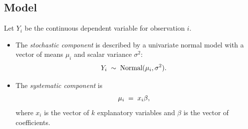 \documentclass[letterpaper,10pt,english]{sphinxmanual}
\begin{document}
\subsection{Model}
\label{vignette:id36}
Let \(Y_i\) be the continuous dependent variable for observation
\(i\).
\begin{itemize}
\item {} 
The \emph{stochastic component} is described by a univariate normal model
with a vector of means \(\mu_i\) and scalar variance
\(\sigma^2\):
\begin{gather}
\begin{split}Y_i \; \sim \; \textrm{Normal}(\mu_i, \sigma^2).\end{split}\notag
\end{gather}
\item {} 
The \emph{systematic component} is
\begin{gather}
\begin{split}\mu_i \;= \; x_i \beta,\end{split}\notag
\end{gather}
where \(x_i\) is the vector of \(k\) explanatory variables
and \(\beta\) is the vector of coefficients.

\end{itemize}
\end{document}
